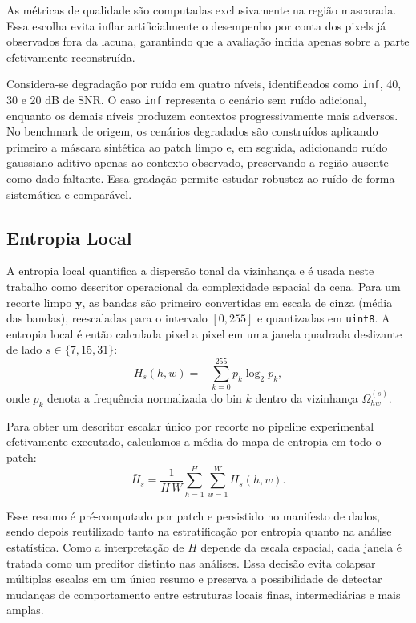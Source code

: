 As métricas de qualidade são computadas exclusivamente na região mascarada.
Essa escolha evita inflar artificialmente o desempenho por conta dos pixels já observados fora da lacuna, garantindo que a avaliação incida apenas sobre a parte efetivamente reconstruída.

Considera-se degradação por ruído em quatro níveis, identificados como \texttt{inf}, 40, 30 e 20 dB de \gls{SNR}.
O caso \texttt{inf} representa o cenário sem ruído adicional, enquanto os demais níveis produzem contextos progressivamente mais adversos.
No benchmark de origem, os cenários degradados são construídos aplicando primeiro a máscara sintética ao patch limpo e, em seguida, adicionando ruído gaussiano aditivo apenas ao contexto observado, preservando a região ausente como dado faltante.
Essa gradação permite estudar robustez ao ruído de forma sistemática e comparável.

\subsection{Entropia Local}
\label{sec:entropy}

A entropia local quantifica a dispersão tonal da vizinhança e é usada neste trabalho como descritor operacional da complexidade espacial da cena.
Para um recorte limpo $\mathbf{y}$, as bandas são primeiro convertidas em escala de cinza (média das bandas), reescaladas para o intervalo $[0,255]$ e quantizadas em \texttt{uint8}.
A entropia local é então calculada pixel a pixel em uma janela quadrada deslizante de lado $s \in \{7, 15, 31\}$:
\[
  H_s(h,w) = -\sum_{k=0}^{255} p_k \log_2 p_k,
\]
onde $p_k$ denota a frequência normalizada do bin $k$ dentro da vizinhança $\Omega_{hw}^{(s)}$.

Para obter um descritor escalar único por recorte no pipeline experimental efetivamente executado, calculamos a média do mapa de entropia em todo o patch:
\[
  \bar{H}_s
  = \frac{1}{H\,W}
  \sum_{h=1}^{H} \sum_{w=1}^{W} H_s(h,w).
\]

Esse resumo é pré-computado por patch e persistido no manifesto de dados, sendo depois reutilizado tanto na estratificação por entropia quanto na análise estatística.
Como a interpretação de $H$ depende da escala espacial, cada janela é tratada como um preditor distinto nas análises.
Essa decisão evita colapsar múltiplas escalas em um único resumo e preserva a possibilidade de detectar mudanças de comportamento entre estruturas locais finas, intermediárias e mais amplas.

